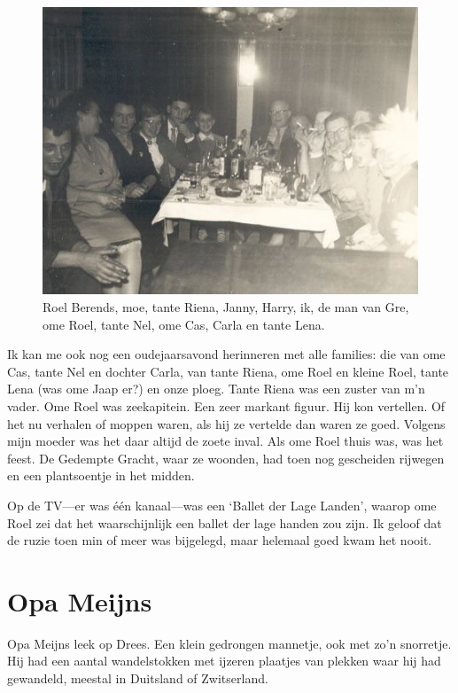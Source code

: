 \documentclass[10pt,twoside, openright]{memoir}
\begin{document}
\begin{figure}
\includegraphics[width=\textwidth]{img/ch1/oudnieuw}
\caption*{\footnotesize Roel Berends, moe, tante Riena, Janny, Harry, ik, de man van Gre, ome Roel, tante Nel, ome Cas, Carla en tante Lena.}
\end{figure} 

Ik kan me ook nog een oudejaarsavond herinneren met alle families: die van ome Cas, tante Nel en dochter Carla, van tante Riena, ome Roel en kleine Roel, tante Lena (was ome Jaap er?) en onze ploeg. Tante Riena was een zuster van m’n vader. Ome Roel was zeekapitein. Een zeer markant figuur. Hij kon vertellen. Of het nu verhalen of moppen waren, als hij ze vertelde dan waren ze goed. Volgens mijn moeder was het daar altijd de zoete inval. Als ome Roel thuis was, was het feest. De Gedempte Gracht, waar ze woonden, had toen nog gescheiden rijwegen en een plantsoentje in het midden. 

Op de TV---er was één kanaal---was een `Ballet der Lage Landen', waarop ome Roel zei dat het waarschijnlijk een ballet der lage handen zou zijn. Ik geloof dat de ruzie toen min of meer was bijgelegd, maar helemaal goed kwam het nooit.  



\chapter{Opa Meijns} %
\label{cha:opa_meijns}

Opa Meijns leek op Drees. Een klein gedrongen mannetje, ook met zo’n snorretje. Hij had een aantal wandelstokken met ijzeren plaatjes van plekken waar hij had gewandeld, meestal in Duitsland of Zwitserland.
\end{document}
